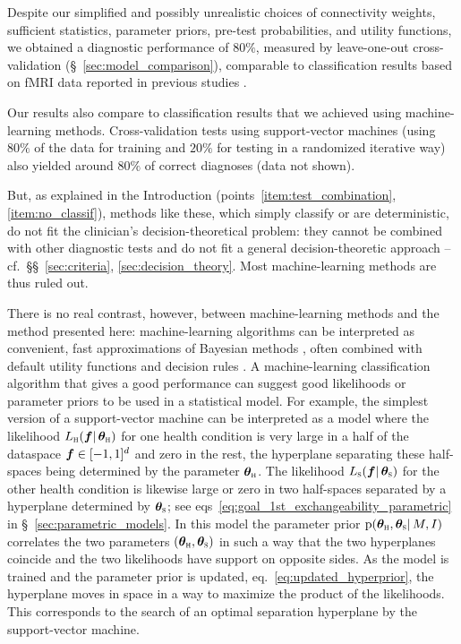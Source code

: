 \documentclass[%
]{frontiersSCNS-nologo} %
\newcommand*{\chap}{ch.} %
\newcommand*{\sect}{\S} %
\newcommand*{\sects}{\S\S} %
\newcommand*{\eqn}{eq.}
\newcommand*{\eqns}{eqs}
\newcommand*{\eg}{e.g.}
\newcommand*{\cf}{{cf.}}
\newcommand*{\pf}{\mathrm{p}}%
\renewcommand*{\|}{\mathpunct{|}}%
\DeclarePairedDelimiter\clcl{[}{]}
\newcommand*{\yhu}{\textsc{h}}
\newcommand*{\yhd}{\textsc{s}}
\newcommand*{\yxx}{f}
\newcommand*{\yx}{\bm{\yxx}}
\newcommand*{\yd}{d}
\newcommand*{\yI}{I}
\newcommand*{\yM}{M}
\newcommand*{\yth}{\bm{\theta}}
\newcommand*{\ythh}{\yth_{\yhu}}
\newcommand*{\yths}{\yth_{\yhd}}
\newcommand*{\yL}{L}
\begin{document}
Despite our simplified and possibly unrealistic choices of connectivity
weights, sufficient statistics, parameter priors, pre-test probabilities,
and utility functions, we obtained a diagnostic performance of $80\%$,
measured by leave-one-out cross-validation
(\sect~\ref{sec:model_comparison}), comparable to classification results
based on fMRI data reported in previous studies
\citetext{\eg, \citealp[18~healthy + 18~schizophrenic patients]{venkataramanetal2012}; 
  \citealp[45~+ 46 patients]{cetinetal2016}; 
  \citealp[36~+ 34 patients]{demircietal2008}
}.

\medskip

Our results also compare to classification results that we achieved using
machine-learning methods. Cross-validation tests using support-vector
machines (using $80\%$ of the data for training and $20\%$ for testing in a
randomized iterative way) also yielded around $80\%$ of correct diagnoses (data not shown).

But, as explained in the Introduction (points~\ref{item:test_combination},
\ref{item:no_classif}), methods like these, which simply classify or are
deterministic, do not fit the clinician's decision-theoretical problem:
they cannot be combined with other diagnostic tests and do not fit a
general decision-theoretic approach -- \cf\ \sects~\ref{sec:criteria},
\ref{sec:decision_theory}. Most machine-learning methods
\citep{bishop2006,murphy2012} are thus ruled out.

There is no real contrast, however, between machine-learning methods and
the method presented here: machine-learning algorithms can be interpreted
as convenient, fast approximations  of
Bayesian methods \citep[see \eg\ the explicative image in][]{huszar2017},
often combined with default utility functions and decision rules
\citep{murphy2012,mackay1995_r2003,mackay1992,mackay1992b,mackay1992c,mackay1992d,mackay1992e}.
A machine-learning classification algorithm that gives a good performance
can suggest good likelihoods or parameter priors to be used in a
statistical model. For example, the simplest version of a support-vector
machine \citetext{\citealp[\chap~7]{bishop2006};
  \citealp[\sect~14.5]{murphy2012}} can be interpreted as a model where the
likelihood $\yL_{\yhu}(\yx\|\ythh)$ for one health condition is very large
in a half of the dataspace $\yx\in\clcl{-1,1}^{\yd}$ and zero in the rest,
the hyperplane separating these half-spaces being determined by the
parameter $\ythh$. The likelihood $\yL_{\yhd}(\yx\|\yths)$ for the other
health condition is likewise large or zero in two half-spaces separated by
a hyperplane determined by $\yths$; see
\eqns~\eqref{eq:goal_1st_exchangeability_parametric} in
\sect~\ref{sec:parametric_models}. In this model the parameter prior
$\pf(\ythh, \yths \|\yM ,\yI)$ correlates the two parameters
$(\ythh, \yths)$ in such a way that the two hyperplanes coincide and the
two likelihoods have support on opposite sides. As the model is trained and
the parameter prior is updated, \eqn~\eqref{eq:updated_hyperprior}, the
hyperplane moves in space in a way to maximize the product of the
likelihoods. This corresponds to the search of an optimal separation
hyperplane by the support-vector machine.
\end{document}
